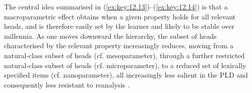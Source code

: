 \documentclass[output=paper]{langsci/langscibook}
\begin{document}
\ea\label{ex:key:12.14}
    \hspace*{-1.75em}\vspace*{-1\baselineskip}
\z\vspace{1.0\baselineskip}

The central idea summarised in (\ref{ex:key:12.13})--(\ref{ex:key:12.14}) is that a macroparametric effect
obtains when a given property holds for all relevant heads, and is therefore
easily set by the learner and likely to be stable over millennia. As one moves
downward the hierarchy, the subset of heads characterised by the relevant
property increasingly reduces, moving from a natural-class subset of heads (cf.
mesoparameter), through a further restricted natural-class subset of heads (cf.
microparameter), to a reduced set of lexically specified items (cf.
nanoparameter), all increasingly less salient in the \gls{PLD} and consequently less
resistant to reanalysis \parencite[261]{BibRob2016}.
\end{document}
